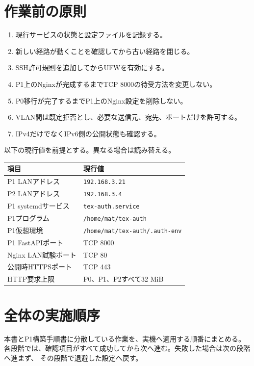 \documentclass[uplatex,a4paper,11pt]{jsarticle}
\begin{document}
\section{作業前の原則}

\begin{enumerate}
  \item 現行サービスの状態と設定ファイルを記録する。
  \item 新しい経路が動くことを確認してから古い経路を閉じる。
  \item SSH許可規則を追加してからUFWを有効にする。
  \item P1上のNginxが完成するまでTCP 8000の待受方法を変更しない。
  \item P0移行が完了するまでP1上のNginx設定を削除しない。
  \item VLAN間は既定拒否とし、必要な送信元、宛先、ポートだけを許可する。
  \item IPv4だけでなくIPv6側の公開状態も確認する。
\end{enumerate}

以下の現行値を前提とする。異なる場合は読み替える。

\begin{longtable}{@{}p{52mm}p{96mm}@{}}
\toprule
項目 & 現行値\\
\midrule
P1 LANアドレス & \texttt{192.168.3.21}\\
P2 LANアドレス & \texttt{192.168.3.4}\\
P1 systemdサービス & \texttt{tex-auth.service}\\
P1プログラム & \texttt{/home/mat/tex-auth}\\
P1仮想環境 & \texttt{/home/mat/tex-auth/.auth-env}\\
P1 FastAPIポート & TCP 8000\\
Nginx LAN試験ポート & TCP 80\\
公開時HTTPSポート & TCP 443\\
HTTP要求上限 & P0、P1、P2すべて32 MiB\\
\bottomrule
\end{longtable}

\newpage
\section{全体の実施順序}

本書とP1構築手順書に分散している作業を、実機へ適用する順番にまとめる。
各段階では、確認項目がすべて成功してから次へ進む。失敗した場合は次の段階へ進まず、
その段階で退避した設定へ戻す。
\end{document}
